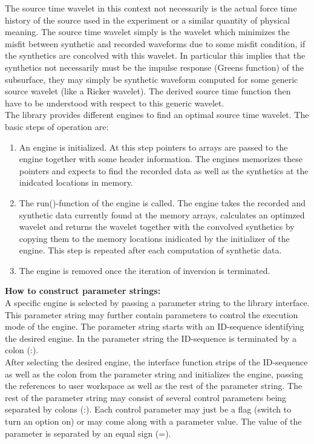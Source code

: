 The source time wavelet in this context not necessarily is the actual force time history of the source used in the experiment or a similar quantity of physical meaning. The source time wavelet simply is the wavelet which minimizes the misfit between synthetic and recorded waveforms due to some misfit condition, if the synthetics are concolved with this wavelet. In particular this implies that the synthetics not necessarily must be the impulse response (Greens function) of the subsurface, they may simply be synthetic waveform computed for some generic source wavelet (like a Ricker wavelet). The derived source time function then have to be understood with respect to this generic wavelet.\\
\newline
The library provides different engines to find an optimal source time wavelet. The basic steps of operation are:
\begin{enumerate}
 \item An engine is initialized. At this step pointers to arrays are passed to the engine together with some header information. The engines memorizes these pointers and expects to find the recorded data as well as the synthetics at the inidcated locations in memory.
 \item The run()-function of the engine is called. The engine takes the recorded and synthetic data currently found at the memory arrays, calculates an optimzed wavelet and returns the wavelet together with the convolved synthetics by copying them to the memory locations inidicated by the initializer of the engine. This step is repeated after each computation of synthetic data.
 \item The engine is removed once the iteration of inversion is terminated.
\end{enumerate}
\textbf{How to construct parameter strings:}\\
A specific engine is selected by passing a parameter string to the library interface. This parameter string may further contain parameters to control the execution mode of the engine. The parameter string starts with an ID-sequence identifying the desired engine. In the parameter string the ID-sequence is terminated by a colon (:).\\

After selecting the desired engine, the interface function strips of the ID-sequence as well as the colon from the parameter string and initializes the engine, passing the references to user workspace as well as the rest of the parameter string. The rest of the parameter string may consist of several control parameters being separated by colons (:). Each control parameter may just be a flag (switch to turn an option on) or may come along with a parameter value. The value of the parameter is separated by an equal sign (=).

